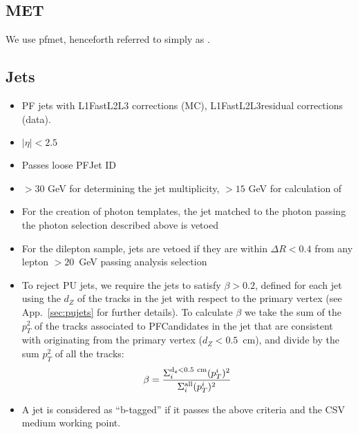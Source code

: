 \subsection{MET}

We use pfmet, henceforth referred to simply as \MET.

\subsection{Jets}
\label{sec:jetsel}

\begin{itemize}
\item PF jets with L1FastL2L3 corrections (MC), L1FastL2L3residual corrections (data).
\item $|\eta| < 2.5$
\item Passes loose PFJet ID
\item \pt $ > 30$ GeV for determining the jet multiplicity, \pt $ > 15$ GeV for calculation of \Ht
\item For the creation of photon templates, the jet matched to the photon passing the photon selection described above is vetoed
\item For the dilepton sample, jets are vetoed if they are within $\Delta R < 0.4$ 
from any lepton \pt $ > 20$~GeV passing analysis selection
\item To reject PU jets, we require the jets to satisfy $\beta>0.2$, defined for each jet using the $d_Z$ of the tracks in the jet with
respect to the primary vertex (see App.~\ref{sec:pujets} for further details). 
To calculate $\beta$ we take the sum of the $p_{T}^{2}$ of the tracks associated to PFCandidates in the jet
that are consistent with originating from the primary vertex ($d_Z<0.5$~cm), and divide by the sum $p_{T}^{2}$ of all the tracks:
\begin{equation}
\beta = \frac{\Sigma_{i}^{\rm{d_z<0.5~cm}} (p_{T}^{i})^2}{\Sigma_{i}^{\rm{all}}  (p_{T}^{i})^2}
\end{equation}
\item A jet is considered as ``b-tagged'' if it passes the above criteria and the CSV medium working point.
\end{itemize}


